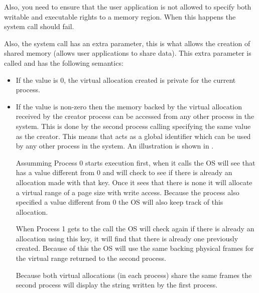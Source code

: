 Also, you need to ensure that the user application is not allowed to specify both writable and
executable rights to a memory region. When this happens the system call should fail.

Also, the system call has an extra parameter, this is what allows the creation of shared memory (allows
user applications to share data). This extra parameter is called  and has the following
semantics:
\begin{itemize}
	\item If the value is 0, the virtual allocation created is private for the current process.

	\item If the value is non-zero then the memory backed by the virtual allocation received by the
creator process can be accessed from any other process in the system. This is done by the second
process calling  specifying the same  value as the creator. This
means that  acts as a global identifier which can be used by any other process in the
system. An illustration is shown in .

	Assumming Process 0 starts execution first, when it calls  the OS will
see that  has a value different from 0 and will check to see if there is already an
allocation made with that key. Once it sees that there is none it will allocate a virtual range of
a page size with write access. Because the process also specified a  value different from 0
the OS will also keep track of this allocation.

	When Process 1 gets to the  call the OS will check again if there is
already an allocation using this key, it will find that there is already one previously created.
Because of this the OS will use the same backing physical frames for the virtual range returned to
the second process.

	Because both virtual allocations (in each process) share the same frames the second process will
display the string written by the first process.

\end{itemize}

